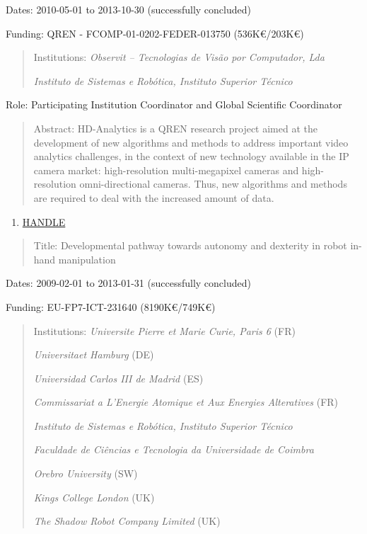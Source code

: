 Dates: 2010-05-01 to 2013-10-30 (successfully concluded)

Funding: QREN - FCOMP-01-0202-FEDER-013750 (536K€/203K€)

\begin{quote}
Institutions: \emph{Observit -- Tecnologias de Visão por Computador,
Lda}

\emph{Instituto de Sistemas e Robótica, Instituto Superior Técnico}
\end{quote}

Role: Participating Institution Coordinator and Global Scientific
Coordinator

\begin{quote}
Abstract: HD-Analytics is a QREN research project aimed at the
development of new algorithms and methods to address important video
analytics challenges, in the context of new technology available in the
IP camera market: high-resolution multi-megapixel cameras and
high-resolution omni-directional cameras. Thus, new algorithms and
methods are required to deal with the increased amount of data.
\end{quote}

\begin{enumerate}
\def\labelenumi{\arabic{enumi}.}
\setcounter{enumi}{6}
\item
  \ul{HANDLE}
\end{enumerate}

\begin{quote}
Title: Developmental pathway towards autonomy and dexterity in robot
in-hand manipulation
\end{quote}

Dates: 2009-02-01 to 2013-01-31 (successfully concluded)

Funding: EU-FP7-ICT-231640 (8190K€/749K€)

\begin{quote}
Institutions: \emph{Universite Pierre et Marie Curie, Paris 6} (FR)

\emph{Universitaet Hamburg} (DE)

\emph{Universidad Carlos III de Madrid} (ES)

\emph{Commissariat a L'Energie Atomique et Aux Energies Alteratives}
(FR)

\emph{Instituto de Sistemas e Robótica, Instituto Superior Técnico}

\emph{Faculdade de Ciências e Tecnologia da Universidade de Coimbra}

\emph{Orebro University} (SW)

\emph{Kings College London} (UK)

\emph{The Shadow Robot Company Limited} (UK)
\end{quote}

